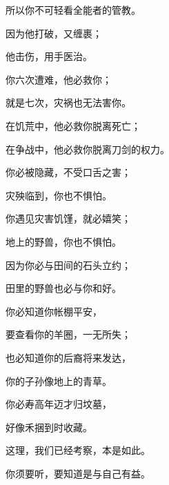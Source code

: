 {\par }{\Q 所以你不可轻看全能者的管教。
\par }{\Q {}因为他打破，又缠裹；
\par }{\Q 他击伤，用手医治。
\par }{\Q {}你六次遭难，他必救你；
\par }{\Q 就是七次，灾祸也无法害你。
\par }{\Q {}在饥荒中，他必救你脱离死亡；
\par }{\Q 在争战中，他必救你脱离刀剑的权力。
\par }{\Q {}你必被隐藏，不受口舌之害；
\par }{\Q 灾殃临到，你也不惧怕。
\par }{\Q {}你遇见灾害饥馑，就必嬉笑；
\par }{\Q 地上的野兽，你也不惧怕。
\par }{\Q {}因为你必与田间的石头立约；
\par }{\Q 田里的野兽也必与你和好。
\par }{\Q {}你必知道你帐棚平安，
\par }{\Q 要查看你的羊圈，一无所失；
\par }{\Q {}也必知道你的后裔将来发达，
\par }{\Q 你的子孙像地上的青草。
\par }{\Q {}你必寿高年迈才归坟墓，
\par }{\Q 好像禾捆到时收藏。
\par }{\Q {}这理，我们已经考察，本是如此。
\par }{\Q 你须要听，要知道是与自己有益。

}
